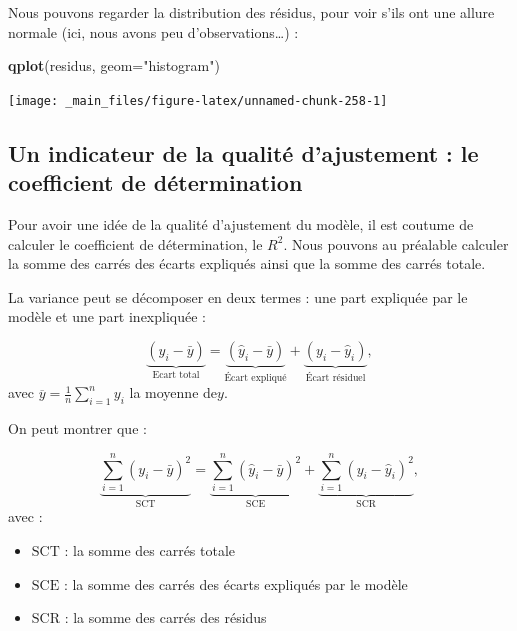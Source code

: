 \documentclass[
  11pt,
]{book}
\newenvironment{Shaded}{\begin{snugshade}}{\end{snugshade}}
\newcommand{\AttributeTok}[1]{\textcolor[rgb]{0.13,0.29,0.53}{#1}}
\newcommand{\FunctionTok}[1]{\textcolor[rgb]{0.13,0.29,0.53}{\textbf{#1}}}
\newcommand{\NormalTok}[1]{#1}
\newcommand{\StringTok}[1]{\textcolor[rgb]{0.31,0.60,0.02}{#1}}
\providecommand{\tightlist}{%
  \setlength{\itemsep}{0pt}\setlength{\parskip}{0pt}}
\numberwithin{equation}{section}
\numberwithin{countremarque}{section}
\begin{document}
Nous pouvons regarder la distribution des résidus, pour voir s'ils ont une allure normale (ici, nous avons peu d'observations\ldots) :

\begin{Shaded}
\begin{Highlighting}[]
\FunctionTok{qplot}\NormalTok{(residus, }\AttributeTok{geom=}\StringTok{"histogram"}\NormalTok{)}
\end{Highlighting}
\end{Shaded}

\begin{center}\texttt{[image: \_main\_files/figure-latex/unnamed-chunk-258-1]} \end{center}

\hypertarget{un-indicateur-de-la-qualituxe9-dajustement-le-coefficient-de-duxe9termination}{%
\subsection{Un indicateur de la qualité d'ajustement : le coefficient de détermination}\label{un-indicateur-de-la-qualituxe9-dajustement-le-coefficient-de-duxe9termination}}

Pour avoir une idée de la qualité d'ajustement du modèle, il est coutume de calculer le coefficient de détermination, le \(R^2\). Nous pouvons au préalable calculer la somme des carrés des écarts expliqués ainsi que la somme des carrés totale.

La variance peut se décomposer en deux termes : une part expliquée par le modèle et une part inexpliquée :

\[\underbrace{(y_i - \bar{y})}_{\text{Ecart total}} = \underbrace{(\hat{y}_i - \bar{y})}_{\text{Écart expliqué}} + \underbrace{(y_i - \hat{y}_i)}_{\text{Écart résiduel}},\]
avec \(\overline y = \frac{1}{n}\sum_{i=1}^{n} y_i\) la moyenne de\(y\).

On peut montrer que :

\[\underbrace{\sum_{i=1}^{n}(y_i - \bar{y})^2}_{\text{SCT}} = \underbrace{\sum_{i=1}^{n}(\hat{y}_i - \bar{y})^2}_{\text{SCE}} + \underbrace{\sum_{i=1}^{n}(y_i - \hat{y}_i)^2}_{\text{SCR}},\]
avec :

\begin{itemize}
\tightlist
\item
  \(\text{SCT}\) : la somme des carrés totale
\item
  \(\text{SCE}\) : la somme des carrés des écarts expliqués par le modèle
\item
  \(\text{SCR}\) : la somme des carrés des résidus
\end{itemize}
\end{document}
